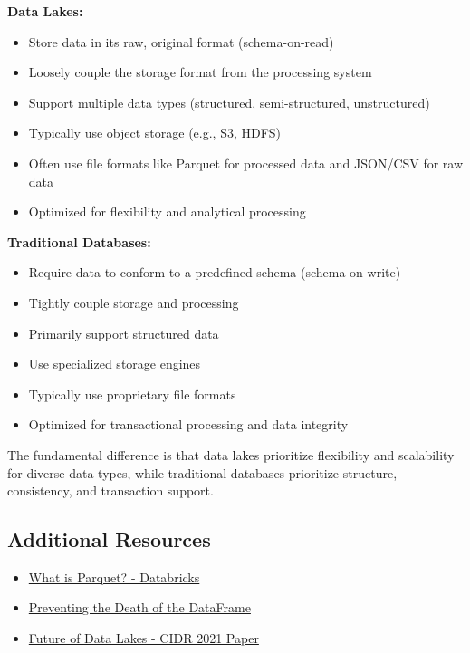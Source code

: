 \documentclass[12pt]{article}
\begin{document}
\begin{enumerate}
\begin{tcolorbox}[colback=blue!5!white,colframe=blue!75!black,title={Solution}]
    \textbf{Data Lakes:}
    \begin{itemize}
        \item Store data in its raw, original format (schema-on-read)
        \item Loosely couple the storage format from the processing system
        \item Support multiple data types (structured, semi-structured, unstructured)
        \item Typically use object storage (e.g., S3, HDFS)
        \item Often use file formats like Parquet for processed data and JSON/CSV for raw data
        \item Optimized for flexibility and analytical processing
    \end{itemize}
    
    \textbf{Traditional Databases:}
    \begin{itemize}
        \item Require data to conform to a predefined schema (schema-on-write)
        \item Tightly couple storage and processing
        \item Primarily support structured data
        \item Use specialized storage engines
        \item Typically use proprietary file formats
        \item Optimized for transactional processing and data integrity
    \end{itemize}
    
    The fundamental difference is that data lakes prioritize flexibility and scalability for diverse data types, while traditional databases prioritize structure, consistency, and transaction support.
    \end{tcolorbox}
\end{enumerate}

\subsection{Additional Resources}

\begin{itemize}
    \item \href{https://databricks.com/glossary/what-is-parquet}{What is Parquet? - Databricks}
    \item \href{https://towardsdatascience.com/preventing-the-death-of-the-dataframe-8bca1c0f83c8}{Preventing the Death of the DataFrame}
    \item \href{http://cidrdb.org/cidr2021/papers/cidr2021_paper17.pdf}{Future of Data Lakes - CIDR 2021 Paper}
\end{itemize}
\end{document}
